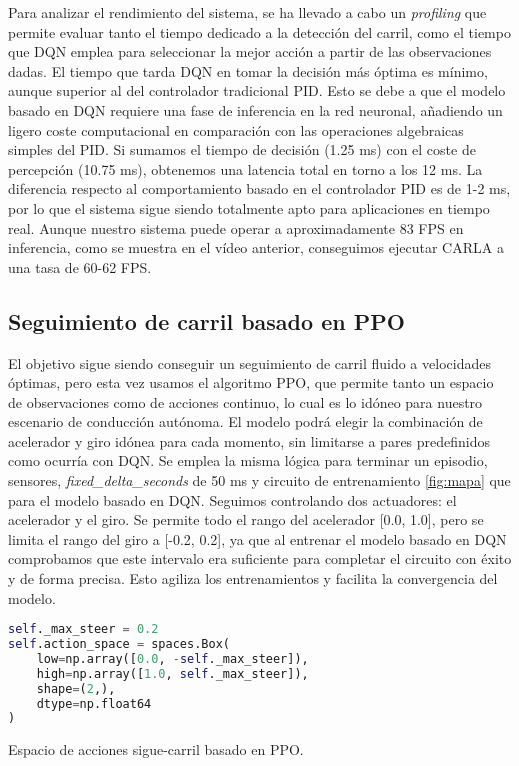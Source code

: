 Para analizar el rendimiento del sistema, se ha llevado a cabo un \textit{profiling} que permite evaluar tanto el tiempo dedicado a la detección del carril, como el tiempo que \ac{DQN} emplea para seleccionar la mejor acción a partir de las observaciones dadas. El tiempo que tarda \ac{DQN} en tomar la decisión más óptima es mínimo, aunque superior al del controlador tradicional \ac{PID}. Esto se debe a que el modelo basado en \ac{DQN} requiere una fase de inferencia en la red neuronal, añadiendo un ligero coste computacional en comparación con las operaciones algebraicas simples del \ac{PID}. Si sumamos el tiempo de decisión (1.25 ms) con el coste de percepción (10.75 ms), obtenemos una latencia total en torno a los 12 ms. La diferencia respecto al comportamiento basado en el controlador \ac{PID} es de 1-2 ms, por lo que el sistema sigue siendo totalmente apto para aplicaciones en tiempo real. Aunque nuestro sistema puede operar a aproximadamente 83 \ac{FPS} en inferencia, como se muestra en el vídeo anterior\footnotemark[3], conseguimos ejecutar CARLA a una tasa de 60-62 \ac{FPS}.

\subsection{Seguimiento de carril basado en \ac{PPO}}

El objetivo sigue siendo conseguir un seguimiento de carril fluido a velocidades óptimas, pero esta vez usamos el algoritmo \ac{PPO}, que permite tanto un espacio de observaciones como de acciones continuo, lo cual es lo idóneo para nuestro escenario de conducción autónoma. El modelo podrá elegir la combinación de acelerador y giro idónea para cada momento, sin limitarse a pares predefinidos como ocurría con \ac{DQN}. Se emplea la misma lógica para terminar un episodio, sensores, \textit{fixed\_delta\_seconds} de 50 ms y circuito de entrenamiento \ref{fig:mapa} que para el modelo basado en \ac{DQN}. Seguimos controlando dos actuadores: el acelerador y el giro. Se permite todo el rango del acelerador [0.0, 1.0], pero se limita el rango del giro a [-0.2, 0.2], ya que al entrenar el modelo basado en \ac{DQN} comprobamos que este intervalo era suficiente para completar el circuito con éxito y de forma precisa. Esto agiliza los entrenamientos y facilita la convergencia del modelo.

\begin{code}[h]
\begin{lstlisting}[language=Python]
self._max_steer = 0.2
self.action_space = spaces.Box(
    low=np.array([0.0, -self._max_steer]),
    high=np.array([1.0, self._max_steer]),
    shape=(2,),
    dtype=np.float64
)
\end{lstlisting}
\caption[Espacio de acciones sigue-carril basado en \ac{PPO}]{Espacio de acciones sigue-carril basado en \ac{PPO}.}
\label{cod:acc_ppo}
\end{code}

